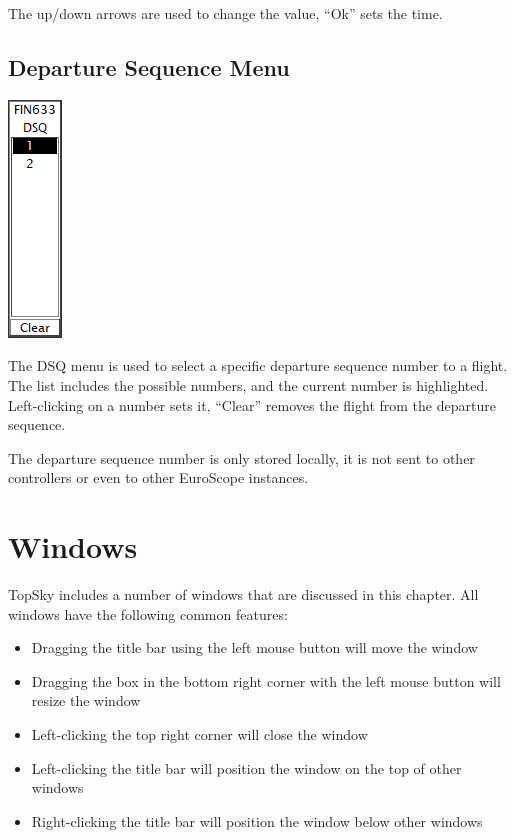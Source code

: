 \documentclass[11pt,a4paper]{memoir}
\newenvironment{Note}
  {\begin{shaded}\marginnote{\fbox{Note}}}
  {\end{shaded}}
\begin{document}
The up/down arrows are used to change the value, “Ok” sets the time.

\subsection{Departure Sequence Menu}
\label{dqm}
\includegraphics{img/dsq.png}

The DSQ menu is used to select a specific departure sequence number to a flight. The list includes the possible numbers, and the current number is highlighted. Left-clicking on a number sets it, “Clear” removes the flight from the departure sequence.

\begin{Note}
The departure sequence number is only stored locally, it is not sent to other controllers or even to other EuroScope instances.
\end{Note}

\section{Windows}
TopSky includes a number of windows that are discussed in this chapter. All windows have the following common features:

\begin{itemize}
    \item Dragging the title bar using the left mouse button will move the window
    \item Dragging the box in the bottom right corner with the left mouse button will resize the window
    \item Left-clicking the top right corner will close the window
    \item Left-clicking the title bar will position the window on the top of other windows
    \item Right-clicking the title bar will position the window below other windows
\end{itemize}
\end{document}
